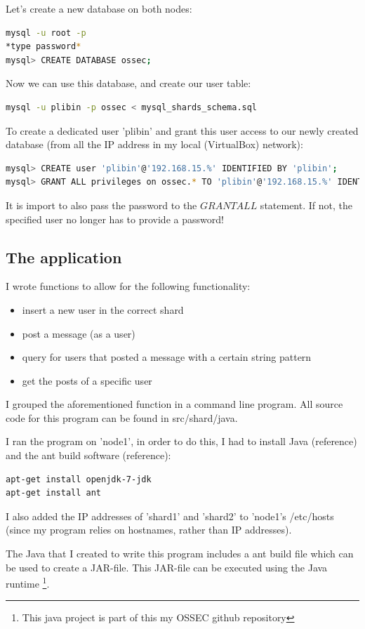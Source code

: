 \documentclass[12pt]{report}
\begin{document}
Let's create a new database on both nodes:
\begin{lstlisting}[language=bash]
mysql -u root -p
*type password*
mysql> CREATE DATABASE ossec;
\end{lstlisting}
Now we can use this database, and create our user table:
\begin{lstlisting}[language=bash]
mysql -u plibin -p ossec < mysql_shards_schema.sql
\end{lstlisting}
To create a dedicated user 'plibin' and grant this user access to our
newly created database (from all the IP address in my local
(VirtualBox) network):
\begin{lstlisting}[language=bash]
mysql> CREATE user 'plibin'@'192.168.15.%' IDENTIFIED BY 'plibin';
mysql> GRANT ALL privileges on ossec.* TO 'plibin'@'192.168.15.%' IDENTIFIED BY 'plibin';
\end{lstlisting}

It is import to also pass the password to the $GRANT ALL$
statement. If not, the specified user no longer has to provide a
password!

\subsection{The application}
I wrote functions to allow for the following functionality:
\begin{itemize}
\item insert a new user in the correct shard
\item post a message (as a user)
\item query for users that posted a message with a certain string
  pattern
\item get the posts of a specific user
\end{itemize}

I grouped the aforementioned function in a command line program. All
source code for this program can be found in src/shard/java.

I ran the program on 'node1', in order to do this, I had to install
Java (reference) and the ant build software (reference):
\begin{lstlisting}[language=bash]
apt-get install openjdk-7-jdk
apt-get install ant
\end{lstlisting}

I also added the IP addresses of 'shard1' and 'shard2' to 'node1's
/etc/hosts (since my program relies on hostnames, rather than IP
addresses).

The Java that I created to write this program includes a ant build
file which can be used to create a JAR-file. This JAR-file can be
executed using the Java runtime \footnote{This java project is part of
this my OSSEC github repository}. 
\end{document}
